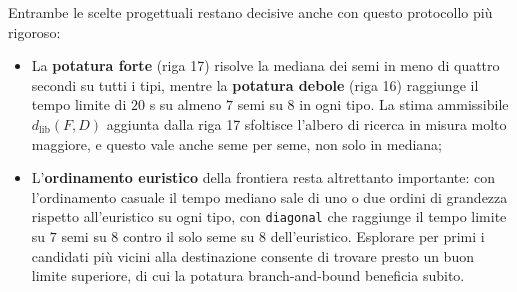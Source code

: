 \begin{table}[H]
\centering
{}
\caption{Tempo mediano per tipo di ostacolo (fra parentesi i semi su $8$ in timeout). La colonna Euristico coincide con Forte perché è la stessa corsa, riusata qui come termine di paragone per l'ordinamento casuale.}
\label{tab:pruning_ordering}
\end{table}

Entrambe le scelte progettuali restano decisive anche con questo protocollo più rigoroso:
\begin{itemize}
    \item La \textbf{potatura forte} (riga 17) risolve la mediana dei semi in meno di quattro secondi su tutti i tipi, mentre la \textbf{potatura debole} (riga 16) raggiunge il tempo limite di $20$ s su almeno $7$ semi su $8$ in ogni tipo. La stima ammissibile $d_{\text{lib}}(F,D)$ aggiunta dalla riga 17 sfoltisce l'albero di ricerca in misura molto maggiore, e questo vale anche seme per seme, non solo in mediana;
    \item L'\textbf{ordinamento euristico} della frontiera resta altrettanto importante: con l'ordinamento casuale il tempo mediano sale di uno o due ordini di grandezza rispetto all'euristico su ogni tipo, con \texttt{diagonal} che raggiunge il tempo limite su $7$ semi su $8$ contro il solo seme su $8$ dell'euristico. Esplorare per primi i candidati più vicini alla destinazione consente di trovare presto un buon limite superiore, di cui la potatura branch-and-bound beneficia subito.
\end{itemize}

